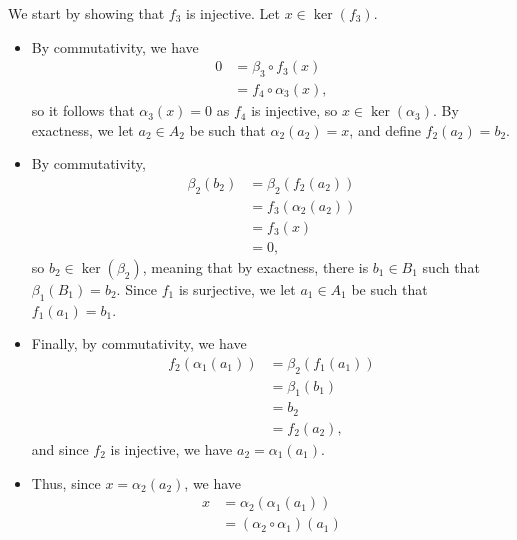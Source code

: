 \documentclass[10pt]{mypackage}
\begin{document}
\begin{solution}
  We start by showing that $f_3$ is injective. Let $x\in \ker\left( f_3 \right)$.
  \begin{itemize}
    \item By commutativity, we have 
      \begin{align*}
        0 &= \beta_3\circ f_3(x)\\
                            &= f_4\circ \alpha_3(x),
      \end{align*}
    so it follows that $\alpha_3(x) = 0$ as $f_4$ is injective, so $x\in \ker\left( \alpha_3 \right)$. By exactness, we let $a_2\in A_2$ be such that $\alpha_2\left(a_2\right) = x$, and define $f_2\left( a_2 \right) = b_2$.
    \item By commutativity, 
      \begin{align*}
        \beta_2\left( b_2 \right) &= \beta_2\left( f_2\left( a_2 \right) \right)\\
                                  &= f_3\left( \alpha_2\left( a_2 \right) \right)\\
                                  &= f_3\left( x \right)\\
                                  &= 0,
      \end{align*}
      so $b_2\in\ker\left( \beta_2 \right)$, meaning that by exactness, there is $b_1 \in B_1$ such that $\beta_1\left( B_1 \right) = b_2$. Since $f_1$ is surjective, we let $a_1\in A_1$ be such that $f_1\left( a_1 \right) = b_1$.
    \item Finally, by commutativity, we have
      \begin{align*}
        f_2\left( \alpha_1\left( a_1 \right) \right) &= \beta_2\left( f_1\left( a_1 \right) \right)\\
                                                     &= \beta_1\left( b_1 \right)\\
                                                     &= b_2\\
                                                     &= f_2\left( a_2 \right),
      \end{align*}
      and since $f_2$ is injective, we have $a_2 = \alpha_1\left( a_1 \right)$.
    \item Thus, since $x = \alpha_2\left( a_2 \right)$, we have 
      \begin{align*}
        x &= \alpha_2\left( \alpha_1\left( a_1 \right) \right)\\
          &= \left( \alpha_2\circ \alpha_1 \right)\left( a_1 \right)\\

\end{align*}
\end{itemize}
\end{solution}
\end{document}
